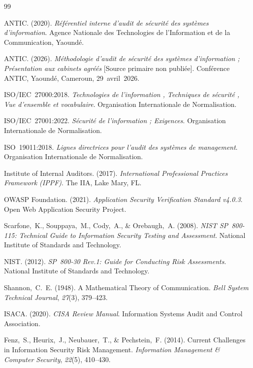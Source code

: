 \documentclass[12pt,a4paper,oneside]{report}
\begin{document}
\begin{thebibliography}{99}

ANTIC. (2020). \textit{R\'ef\'erentiel interne d'audit de s\'ecurit\'e des
syst\`emes d'information}. Agence Nationale des Technologies de l'Information
et de la Communication, Yaound\'e.

ANTIC. (2026). \textit{M\'ethodologie d'audit de s\'ecurit\'e des syst\`emes
d'information ; Pr\'esentation aux cabinets agr\'e\'es} [Source primaire non
publi\'ee]. Conf\'erence ANTIC, Yaound\'e, Cameroun, 29~avril~2026.

ISO/IEC~27000:2018. \textit{Technologies de l'information , Techniques de
s\'ecurit\'e , Vue d'ensemble et vocabulaire}. Organisation Internationale
de Normalisation.

ISO/IEC~27001:2022. \textit{S\'ecurit\'e de l'information ; Exigences}.
Organisation Internationale de Normalisation.

ISO~19011:2018. \textit{Lignes directrices pour l'audit des syst\`emes de
management}. Organisation Internationale de Normalisation.

Institute of Internal Auditors. (2017). \textit{International Professional
Practices Framework (IPPF)}. The IIA, Lake Mary, FL.

OWASP Foundation. (2021). \textit{Application Security Verification Standard
v4.0.3}. Open Web Application Security Project.

Scarfone,~K., Souppaya,~M., Cody,~A., \& Orebaugh,~A. (2008). \textit{NIST
SP~800-115: Technical Guide to Information Security Testing and Assessment}.
National Institute of Standards and Technology.

NIST. (2012). \textit{SP~800-30 Rev.1: Guide for Conducting Risk Assessments}.
National Institute of Standards and Technology.

Shannon,~C.~E. (1948). A Mathematical Theory of Communication. \textit{Bell
System Technical Journal}, \textit{27}(3), 379--423.

ISACA. (2020). \textit{CISA Review Manual}. Information Systems Audit and
Control Association.

Fenz,~S., Heurix,~J., Neubauer,~T., \& Pechstein,~F. (2014). Current Challenges
in Information Security Risk Management. \textit{Information Management \&
Computer Security}, \textit{22}(5), 410--430.


\end{thebibliography}
\end{document}
